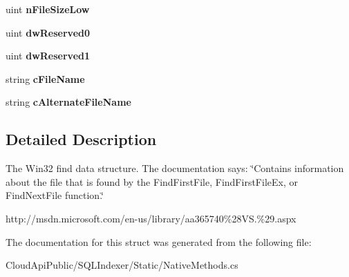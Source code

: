 \begin{DoxyCompactItemize}
\item 
\hypertarget{struct_cloud_api_public_1_1_s_q_l_indexer_1_1_static_1_1_native_methods_1_1_w_i_n32___f_i_n_d___d_a_t_a_a5843729c8613aca2435e03399499c23e}{uint {\bfseries n\-File\-Size\-Low}}\label{struct_cloud_api_public_1_1_s_q_l_indexer_1_1_static_1_1_native_methods_1_1_w_i_n32___f_i_n_d___d_a_t_a_a5843729c8613aca2435e03399499c23e}

\item 
\hypertarget{struct_cloud_api_public_1_1_s_q_l_indexer_1_1_static_1_1_native_methods_1_1_w_i_n32___f_i_n_d___d_a_t_a_aea53680df776bda6f7c976e6b27ca7f5}{uint {\bfseries dw\-Reserved0}}\label{struct_cloud_api_public_1_1_s_q_l_indexer_1_1_static_1_1_native_methods_1_1_w_i_n32___f_i_n_d___d_a_t_a_aea53680df776bda6f7c976e6b27ca7f5}

\item 
\hypertarget{struct_cloud_api_public_1_1_s_q_l_indexer_1_1_static_1_1_native_methods_1_1_w_i_n32___f_i_n_d___d_a_t_a_a69bd2213d7d64f6904a341b7904d69ef}{uint {\bfseries dw\-Reserved1}}\label{struct_cloud_api_public_1_1_s_q_l_indexer_1_1_static_1_1_native_methods_1_1_w_i_n32___f_i_n_d___d_a_t_a_a69bd2213d7d64f6904a341b7904d69ef}

\item 
\hypertarget{struct_cloud_api_public_1_1_s_q_l_indexer_1_1_static_1_1_native_methods_1_1_w_i_n32___f_i_n_d___d_a_t_a_a7140f09a04bb5d75bca75eb43ec78028}{string {\bfseries c\-File\-Name}}\label{struct_cloud_api_public_1_1_s_q_l_indexer_1_1_static_1_1_native_methods_1_1_w_i_n32___f_i_n_d___d_a_t_a_a7140f09a04bb5d75bca75eb43ec78028}

\item 
\hypertarget{struct_cloud_api_public_1_1_s_q_l_indexer_1_1_static_1_1_native_methods_1_1_w_i_n32___f_i_n_d___d_a_t_a_abec217f10f2600daeb0247fd666e601a}{string {\bfseries c\-Alternate\-File\-Name}}\label{struct_cloud_api_public_1_1_s_q_l_indexer_1_1_static_1_1_native_methods_1_1_w_i_n32___f_i_n_d___d_a_t_a_abec217f10f2600daeb0247fd666e601a}

\end{DoxyCompactItemize}


\subsection{Detailed Description}
The Win32 find data structure. The documentation says\-: \char`\"{}\-Contains information about the file that is found by the Find\-First\-File, Find\-First\-File\-Ex, or Find\-Next\-File function.\char`\"{} 

http\-://msdn.\-microsoft.\-com/en-\/us/library/aa365740\%28\-V\-S.\%29.\-aspx 

The documentation for this struct was generated from the following file\-:\begin{DoxyCompactItemize}
\item 
Cloud\-Api\-Public/\-S\-Q\-L\-Indexer/\-Static/Native\-Methods.\-cs\end{DoxyCompactItemize}

